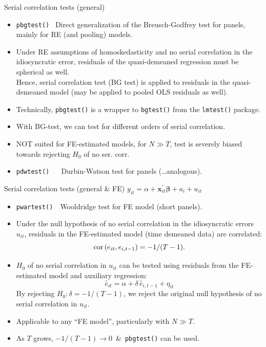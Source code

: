 \documentclass[usenames,dvipsnames]{beamer}
\begin{document}
\begin{frame}{Serial correlation tests (general)}
\begin{itemize}
    \item \texttt{pbgtest()} ~Direct generalization of the Breusch-Godfrey test for panels, mainly for RE (and pooling) models.\\
    \smallskip
    \item Under RE assumptions of homoskedasticity and no serial correlation in the idiosyncratic error, residuals of the quasi-demeaned regression must be spherical as well.\\
    Hence, serial correlation test (BG test) is applied to residuals in the quasi-demeaned model (may be applied to pooled OLS residuals as well).\\
    \smallskip
    \item Technically, \texttt{pbgtest()} is a wrapper to \texttt{bgtest()} from the \texttt{lmtest()} package. 
    \smallskip
    \item With BG-test, we can test for different orders of serial correlation.
    \smallskip
    \item NOT suited for FE-estimated models, for $N \gg T$, test is severely biased towards rejecting $H_0$ of no ser. corr.
    \medskip
    \item \texttt{pdwtest()} ~~ Durbin-Watson test for panels (\dots analogous).
\end{itemize}
\end{frame}
\begin{frame}{Serial correlation tests (general \& FE)}
$y_{it} = \alpha + \bm{x}^{\prime}_{it} \bm{\beta} + a_i + u_{it}$\\ \medskip
\begin{itemize}
    \item \texttt{pwartest()}~~Wooldridge test for FE model (short panels).\\
    \smallskip
    \item Under the null hypothesis of no serial correlation in the idiosyncratic errors $u_{it}$, residuals in the FE-estimated model (time demeaned data) are correlated: $$\textnormal{cor}\left(e_{it},e_{i,t-1}\right)=-1/(T-1).$$
    \item $H_0$ of no serial correlation in $u_{it}$ can be tested using residuals from the FE-estimated model and auxiliary regression:
    $$ \hat{e}_{it} = \alpha + \delta \, \hat{e}_{i,t-1} + \eta_{it}$$
    By rejecting $H_0: \delta = -1/(T-1)$, we reject the original null hypothesis of no serial correlation in  $u_{it}$.
    \smallskip
    \item Applicable to any ``FE model'', particularly with $N \gg T$.
    \smallskip
    \item As $T$ grows, $-1/(T-1) \rightarrow 0$~\&~\texttt{pbgtest()} can be used.
\end{itemize}
\end{frame}
\end{document}
